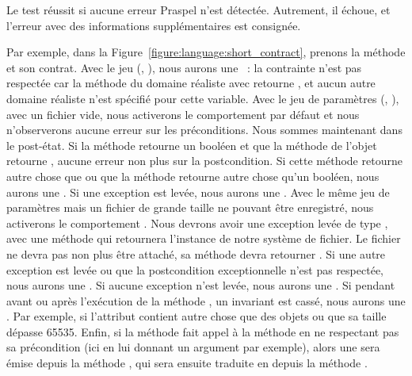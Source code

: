 Le test réussit si aucune erreur Praspel n'est détectée. Autrement, il échoue,
et l'erreur avec des informations supplémentaires est consignée.

Par exemple, dans la Figure~\ref{figure:language:short_contract}, prenons la
méthode  et son contrat.
%
Avec le jeu (, ), nous aurons une ~: la contrainte  n'est pas respectée car la
méthode  du domaine réaliste  avec  retourne , et aucun autre domaine réaliste n'est spécifié
pour cette variable.
%
Avec le jeu de paramètres (, ), avec un fichier
vide, nous activerons le comportement par défaut et nous n'observerons aucune
erreur sur les préconditions. Nous sommes maintenant dans le post-état. Si la
méthode  retourne un booléen et que la méthode  de
l'objet  retourne , aucune erreur non plus sur la
postcondition.  Si cette méthode retourne autre chose que  ou que la
méthode  retourne autre chose qu'un booléen, nous aurons une
. Si une exception est levée, nous aurons une
.
%
Avec le même jeu de paramètres mais un fichier de grande taille ne pouvant être
enregistré, nous activerons le comportement . Nous devrons avoir une
exception levée de type , avec une méthode
 qui retournera l'instance de notre système de fichier. Le
fichier ne devra pas non plus être attaché, \ie sa méthode 
devra retourner . Si une autre exception est levée ou que la
postcondition exceptionnelle n'est pas respectée, nous aurons une
. Si aucune exception n'est levée, nous aurons une
.
%
Si pendant avant ou après l'exécution de la méthode , un invariant
est cassé, nous aurons une . Par exemple, si
l'attribut  contient autre chose que des objets  ou que
sa taille dépasse 65535.
%
Enfin, si la méthode  fait appel à la méthode  en ne
respectant pas sa précondition (ici en lui donnant un argument par exemple),
alors une  sera émise depuis la méthode
, qui sera ensuite traduite en  depuis la méthode .
